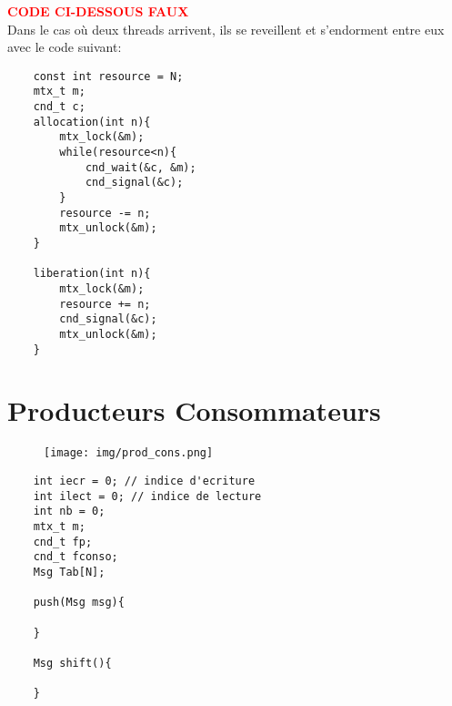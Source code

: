 \documentclass[11pt]{article}
\begin{document}
\textbf{\textcolor{red}{CODE CI-DESSOUS FAUX}}\\
Dans le cas où deux threads arrivent, ils se reveillent et s'endorment entre eux avec le code suivant:
\vspace{-0.4cm}
\begin{verbatim}
	const int resource = N;
	mtx_t m;
	cnd_t c;
	allocation(int n){
		mtx_lock(&m);
		while(resource<n){
			cnd_wait(&c, &m);
			cnd_signal(&c);
		}
		resource -= n;
		mtx_unlock(&m);
	}

	liberation(int n){
		mtx_lock(&m);
		resource += n;
		cnd_signal(&c);
		mtx_unlock(&m);
	}
\end{verbatim}

\pagebreak

\section{Producteurs Consommateurs}
\begin{figure}[h!]
	\centering
	\texttt{[image: img/prod\_cons.png]}
\end{figure}

\vspace{-0.4cm}
\begin{verbatim}
	int iecr = 0; // indice d'ecriture
	int ilect = 0; // indice de lecture
	int nb = 0;
	mtx_t m;
	cnd_t fp;
	cnd_t fconso;
	Msg Tab[N];
	
	push(Msg msg){

	}

	Msg shift(){

	}
\end{verbatim}
\end{document}

